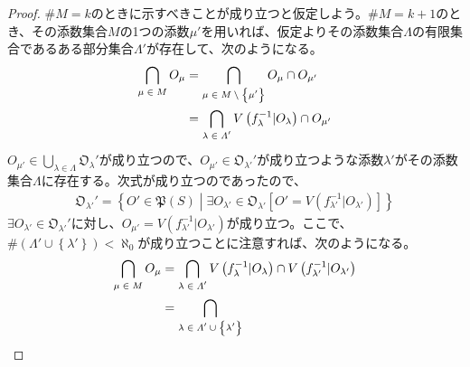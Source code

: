 \documentclass[dvipdfmx]{jsarticle}
\begin{document}
\begin{proof}
${\#}M = k$のときに示すべきことが成り立つと仮定しよう。${\#}M = k + 1$のとき、その添数集合$M$の1つの添数$\mu'$を用いれば、仮定よりその添数集合$\varLambda$の有限集合であるある部分集合$\varLambda'$が存在して、次のようになる。
\begin{align*}
\bigcap_{\scriptsize \begin{matrix}
\mu \in M \\
\end{matrix}} O_{\mu} &= \bigcap_{\scriptsize \begin{matrix}
\mu \in M \setminus \left\{ \mu' \right\} \\
\end{matrix}} O_{\mu} \cap O_{\mu'}\\
&= \bigcap_{\scriptsize \begin{matrix}
\lambda \in \varLambda' \\
\end{matrix}} {V\left( f_{\lambda}^{- 1}|O_{\lambda} \right)} \cap O_{\mu'}
\end{align*}
$O_{\mu'} \in \bigcup_{\lambda \in \varLambda} \mathfrak{O}_{\lambda}'$が成り立つので、$O_{\mu'} \in \mathfrak{O}_{\lambda'}'$が成り立つような添数$\lambda'$がその添数集合$\varLambda$に存在する。次式が成り立つのであったので、
\begin{align*}
\mathfrak{O}_{\lambda'}' = \left\{ O'\in \mathfrak{P}(S) \middle| \exists O_{\lambda'} \in \mathfrak{O}_{\lambda'}\left[ O' = V\left( f_{\lambda'}^{- 1}|O_{\lambda'} \right) \right] \right\}
\end{align*}
$\exists O_{\lambda'} \in \mathfrak{O}_{\lambda'}'$に対し、$O_{\mu'} = V\left( f_{\lambda'}^{- 1}|O_{\lambda'} \right)$が成り立つ。ここで、${\#}\left( \varLambda' \cup \left\{ \lambda' \right\} \right) < \aleph_{0}$が成り立つことに注意すれば、次のようになる。
\begin{align*}
\bigcap_{\scriptsize \begin{matrix}
\mu \in M \\
\end{matrix}} O_{\mu} &= \bigcap_{\scriptsize \begin{matrix}
\lambda \in \varLambda' \\
\end{matrix}} {V\left( f_{\lambda}^{- 1}|O_{\lambda} \right)} \cap V\left( f_{\lambda'}^{- 1}|O_{\lambda'} \right)\\
&= \bigcap_{\scriptsize \begin{matrix}
\lambda \in \varLambda' \cup \left\{ \lambda' \right\} \\

\end{matrix}}
\end{align*}
\end{proof}
\end{document}
